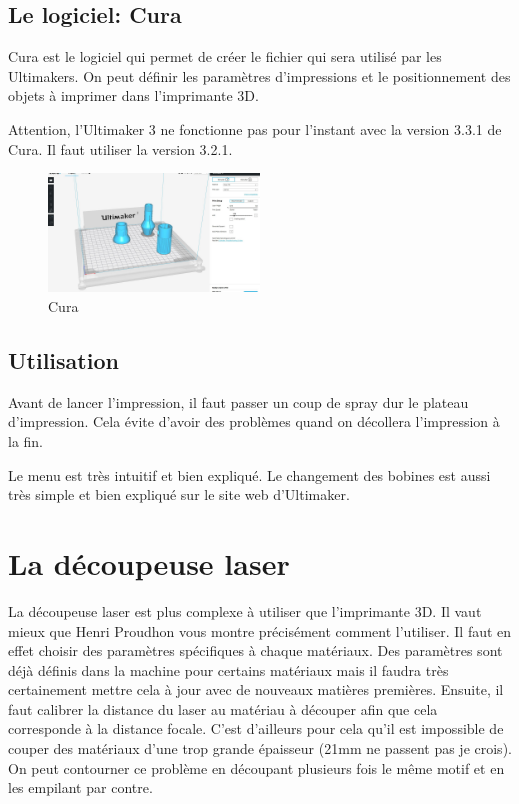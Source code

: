 \documentclass[a4paper, 11pt]{report}
\begin{document}
\subsection{Le logiciel: Cura}
Cura est le logiciel qui permet de créer le fichier qui sera utilisé par les Ultimakers. On peut définir les paramètres d'impressions et le positionnement des objets à imprimer dans l'imprimante 3D. 

Attention, l'Ultimaker 3 ne fonctionne pas pour l'instant avec la version 3.3.1 de Cura. Il faut utiliser la version 3.2.1.

\begin{figure}[h!]
	\begin{center}
		\includegraphics[width=0.5\textwidth]{images/cura.jpg}
		\caption{Cura}
	\end{center}
\end{figure}

\subsection{Utilisation}
Avant de lancer l'impression, il faut passer un coup de spray dur le plateau d'impression. Cela évite d'avoir des problèmes quand on décollera l'impression à la fin.

Le menu est très intuitif et bien expliqué. Le changement des bobines est aussi très simple et bien expliqué sur le site web d'Ultimaker.

\section{La découpeuse laser}
La découpeuse laser est plus complexe à utiliser que l'imprimante 3D. Il vaut mieux que Henri Proudhon vous montre précisément comment l'utiliser. Il faut en effet choisir des paramètres spécifiques à chaque matériaux. Des paramètres sont déjà définis dans la machine pour certains matériaux mais il faudra très certainement mettre cela à jour avec de nouveaux matières premières. Ensuite, il faut calibrer la distance du laser au matériau à découper afin que cela corresponde à la distance focale. C'est d'ailleurs pour cela qu'il est impossible de couper des matériaux d'une trop grande épaisseur (21mm ne passent pas je crois). On peut contourner ce problème en découpant plusieurs fois le même motif et en les empilant par contre.
\end{document}
